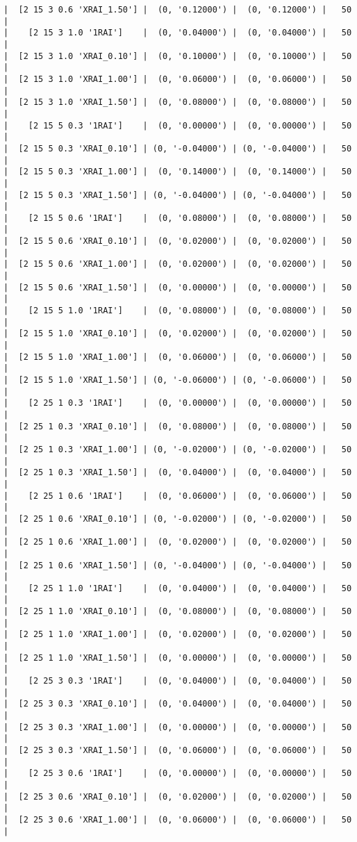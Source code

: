 \documentclass{article}
\begin{document}
\begin{verbatim}
|  [2 15 3 0.6 'XRAI_1.50'] |  (0, '0.12000') |  (0, '0.12000') |   50  |
|    [2 15 3 1.0 '1RAI']    |  (0, '0.04000') |  (0, '0.04000') |   50  |
|  [2 15 3 1.0 'XRAI_0.10'] |  (0, '0.10000') |  (0, '0.10000') |   50  |
|  [2 15 3 1.0 'XRAI_1.00'] |  (0, '0.06000') |  (0, '0.06000') |   50  |
|  [2 15 3 1.0 'XRAI_1.50'] |  (0, '0.08000') |  (0, '0.08000') |   50  |
|    [2 15 5 0.3 '1RAI']    |  (0, '0.00000') |  (0, '0.00000') |   50  |
|  [2 15 5 0.3 'XRAI_0.10'] | (0, '-0.04000') | (0, '-0.04000') |   50  |
|  [2 15 5 0.3 'XRAI_1.00'] |  (0, '0.14000') |  (0, '0.14000') |   50  |
|  [2 15 5 0.3 'XRAI_1.50'] | (0, '-0.04000') | (0, '-0.04000') |   50  |
|    [2 15 5 0.6 '1RAI']    |  (0, '0.08000') |  (0, '0.08000') |   50  |
|  [2 15 5 0.6 'XRAI_0.10'] |  (0, '0.02000') |  (0, '0.02000') |   50  |
|  [2 15 5 0.6 'XRAI_1.00'] |  (0, '0.02000') |  (0, '0.02000') |   50  |
|  [2 15 5 0.6 'XRAI_1.50'] |  (0, '0.00000') |  (0, '0.00000') |   50  |
|    [2 15 5 1.0 '1RAI']    |  (0, '0.08000') |  (0, '0.08000') |   50  |
|  [2 15 5 1.0 'XRAI_0.10'] |  (0, '0.02000') |  (0, '0.02000') |   50  |
|  [2 15 5 1.0 'XRAI_1.00'] |  (0, '0.06000') |  (0, '0.06000') |   50  |
|  [2 15 5 1.0 'XRAI_1.50'] | (0, '-0.06000') | (0, '-0.06000') |   50  |
|    [2 25 1 0.3 '1RAI']    |  (0, '0.00000') |  (0, '0.00000') |   50  |
|  [2 25 1 0.3 'XRAI_0.10'] |  (0, '0.08000') |  (0, '0.08000') |   50  |
|  [2 25 1 0.3 'XRAI_1.00'] | (0, '-0.02000') | (0, '-0.02000') |   50  |
|  [2 25 1 0.3 'XRAI_1.50'] |  (0, '0.04000') |  (0, '0.04000') |   50  |
|    [2 25 1 0.6 '1RAI']    |  (0, '0.06000') |  (0, '0.06000') |   50  |
|  [2 25 1 0.6 'XRAI_0.10'] | (0, '-0.02000') | (0, '-0.02000') |   50  |
|  [2 25 1 0.6 'XRAI_1.00'] |  (0, '0.02000') |  (0, '0.02000') |   50  |
|  [2 25 1 0.6 'XRAI_1.50'] | (0, '-0.04000') | (0, '-0.04000') |   50  |
|    [2 25 1 1.0 '1RAI']    |  (0, '0.04000') |  (0, '0.04000') |   50  |
|  [2 25 1 1.0 'XRAI_0.10'] |  (0, '0.08000') |  (0, '0.08000') |   50  |
|  [2 25 1 1.0 'XRAI_1.00'] |  (0, '0.02000') |  (0, '0.02000') |   50  |
|  [2 25 1 1.0 'XRAI_1.50'] |  (0, '0.00000') |  (0, '0.00000') |   50  |
|    [2 25 3 0.3 '1RAI']    |  (0, '0.04000') |  (0, '0.04000') |   50  |
|  [2 25 3 0.3 'XRAI_0.10'] |  (0, '0.04000') |  (0, '0.04000') |   50  |
|  [2 25 3 0.3 'XRAI_1.00'] |  (0, '0.00000') |  (0, '0.00000') |   50  |
|  [2 25 3 0.3 'XRAI_1.50'] |  (0, '0.06000') |  (0, '0.06000') |   50  |
|    [2 25 3 0.6 '1RAI']    |  (0, '0.00000') |  (0, '0.00000') |   50  |
|  [2 25 3 0.6 'XRAI_0.10'] |  (0, '0.02000') |  (0, '0.02000') |   50  |
|  [2 25 3 0.6 'XRAI_1.00'] |  (0, '0.06000') |  (0, '0.06000') |   50  |

\end{verbatim}
\end{document}
